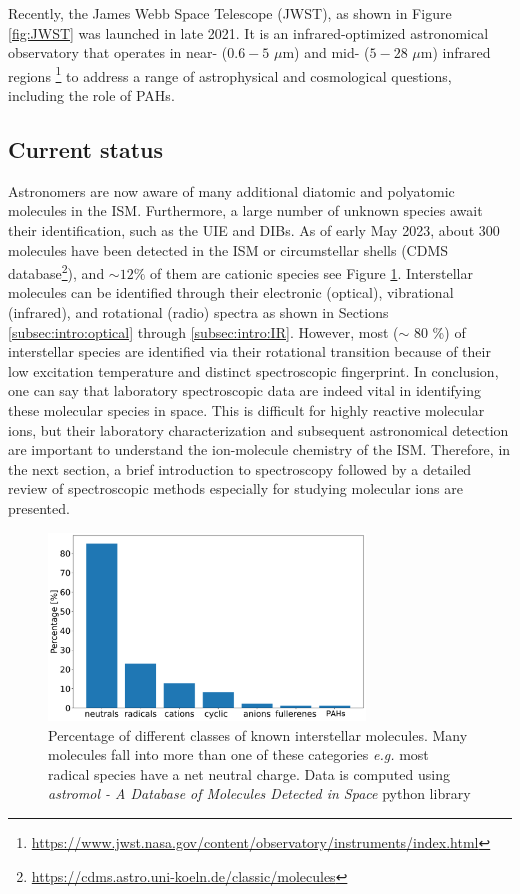 Recently, the James Webb Space Telescope (JWST), as shown in Figure \ref{fig:JWST} was launched in late 2021. It is an infrared-optimized astronomical observatory that operates in near- ($0.6 - 5$ $\mu$m) and mid- ($5 - 28$ $\mu$m) infrared regions \footnote{\url{https://www.jwst.nasa.gov/content/observatory/instruments/index.html}} to address a range of astrophysical and cosmological questions, including the role of PAHs.

\subsection{Current status}
Astronomers are now aware of many additional diatomic and polyatomic molecules in the ISM. Furthermore, a large number of unknown species await their identification, such as the UIE and DIBs. As of early May 2023, about 300 molecules have been detected in the ISM or circumstellar shells (CDMS database\footnote{\url{https://cdms.astro.uni-koeln.de/classic/molecules}}), and $\sim 12 \%$ of them are cationic species \cite{mcguire_2021_2021} see Figure \ref{fig:ISM_molecules}. Interstellar molecules can be identified through their electronic (optical), vibrational (infrared), and rotational (radio) spectra as shown in Sections \ref{subsec:intro:optical} through \ref{subsec:intro:IR}. However, most ($\sim$ 80 \%) of interstellar species are identified via their rotational transition \cite{mcguire_2021_2021} because of their low excitation temperature and distinct spectroscopic  fingerprint. In conclusion, one can say that laboratory spectroscopic data are indeed vital in identifying these molecular species in space. This is difficult for highly reactive molecular ions, but their laboratory characterization and subsequent astronomical detection are important to understand the ion-molecule chemistry of the ISM. Therefore, in the next section, a brief introduction to spectroscopy followed by a detailed review of spectroscopic methods especially for studying molecular ions are presented.

\begin{figure}[!htb]
    \centering
    \includegraphics[width=0.75\textwidth]{figures/intro/known_molecules_in_space.pdf}
    \caption{Percentage of different classes of  known interstellar molecules. Many molecules fall into more than one of these categories \emph{e.g.} most radical species have a net neutral charge. Data is computed using \emph{astromol - A Database of Molecules Detected in Space} python library \cite{mcguire_astromol_2021}}
    \label{fig:ISM_molecules}
\end{figure}
